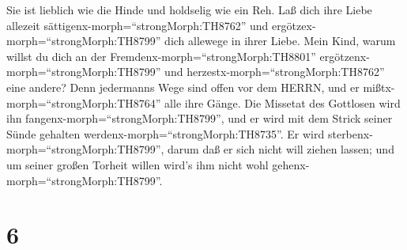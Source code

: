  Sie ist lieblich wie die Hinde und holdselig wie ein Reh.
Laß dich ihre Liebe allezeit sättigenx-morph=``strongMorph:TH8762'' und
ergötzex-morph=``strongMorph:TH8799'' dich allewege in ihrer Liebe.
 Mein Kind, warum willst du dich an der
Fremdenx-morph=``strongMorph:TH8801''
ergötzenx-morph=``strongMorph:TH8799'' und
herzestx-morph=``strongMorph:TH8762'' eine andere?  Denn
jedermanns Wege sind offen vor dem HERRN, und er
mißtx-morph=``strongMorph:TH8764'' alle ihre Gänge.  Die
Missetat des Gottlosen wird ihn fangenx-morph=``strongMorph:TH8799'',
und er wird mit dem Strick seiner Sünde gehalten
werdenx-morph=``strongMorph:TH8735''.  Er wird
sterbenx-morph=``strongMorph:TH8799'', darum daß er sich nicht will
ziehen lassen; und um seiner großen Torheit willen wird's ihm nicht wohl
gehenx-morph=``strongMorph:TH8799''.

\hypertarget{section-5}{%
\section{6}\label{section-5}}

